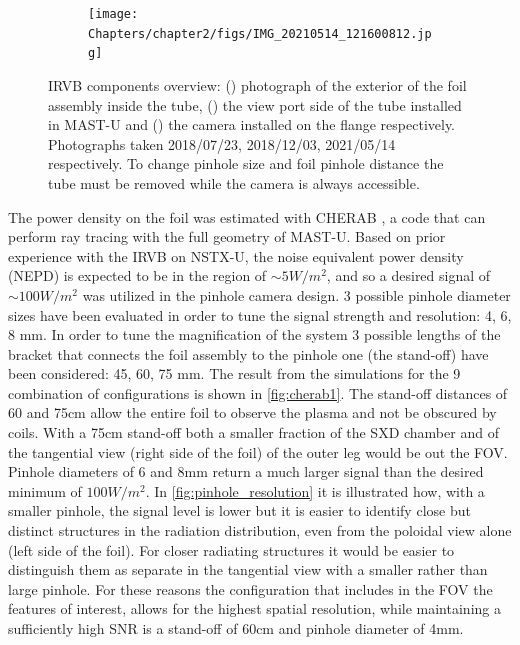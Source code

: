 \begin{figure}[!ht]
\begin{subfigure}{0.49\linewidth}
         \caption{}
         \label{fig:IRVB5}
     \end{subfigure}
     \centering
     \begin{subfigure}{0.8\linewidth}
         \texttt{[image: Chapters/chapter2/figs/IMG\_20210514\_121600812.jpg]}
         \caption{}
         \label{fig:IRVB6}
     \end{subfigure}

    \caption{IRVB components overview: () photograph of the exterior of the foil assembly inside the tube, () the view port side of the tube installed in MAST-U and () the camera installed on the flange respectively. Photographs taken 2018/07/23, 2018/12/03, 2021/05/14 respectively. To change pinhole size and foil pinhole distance the tube must be removed while the camera is always accessible.}
    \label{fig:IRVB_components}
\end{figure}

The power density on the foil was estimated with CHERAB \cite{C.GiroudA.MeakinsM.CarrA.Baciero2018,Carr2017,A.MeakinsCarrM.2017}, a code that can perform ray tracing with the full geometry of MAST-U. Based on prior experience with the IRVB on NSTX-U\cite{Reinke2018}, the noise equivalent power density (NEPD) is expected to be in the region of $\sim5 W/m^2$, and so a desired signal of $\sim100 W/m^2$ was utilized in the pinhole camera design. 3 possible pinhole diameter sizes have been evaluated in order to tune the signal strength and resolution: 4, 6, 8 mm. In order to tune the magnification of the system 3 possible lengths of the bracket that connects the foil assembly to the pinhole one (the stand-off) have been considered: 45, 60, 75 mm. The result from the simulations for the 9 combination of configurations is shown in \autoref{fig:cherab1}.\cite{Federici2022} The stand-off distances of 60 and 75cm allow the entire foil to observe the plasma and not be obscured by coils. With a 75cm stand-off both a smaller fraction of the SXD chamber and of the tangential view (right side of the foil) of the outer leg would be out the FOV. Pinhole diameters of 6 and 8mm return a much larger signal than the desired minimum of $100 W/m^2$. In \autoref{fig:pinhole_resolution} it is illustrated how, with a smaller pinhole, the signal level is lower but it is easier to identify close but distinct structures in the radiation distribution, even from the poloidal view alone (left side of the foil). For closer radiating structures it would be easier to distinguish them as separate in the tangential view  with a smaller rather than large pinhole. For these reasons the configuration that includes in the FOV the features of interest, allows for the highest spatial resolution, while maintaining a sufficiently high SNR is a stand-off of 60cm and pinhole diameter of 4mm.

